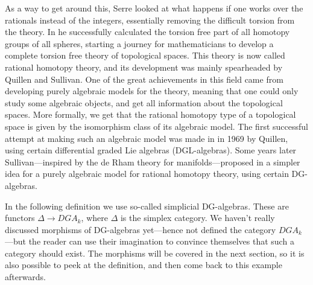 As a way to get around this, Serre looked at what happens if one works over the rationals instead of the integers, essentially removing the difficult torsion from the theory. In \cite{Serre} he successfully calculated the torsion free part of all homotopy groups of all spheres, starting a journey for mathematicians to develop a complete torsion free theory of topological spaces. This theory is now called rational homotopy theory, and its development was mainly spearheaded by Quillen and Sullivan. One of the great achievements in this field came from developing purely algebraic models for the theory, meaning that one could only study some algebraic objects, and get all information about the topological spaces. More formally, we get that the rational homotopy type of a topological space is given by the isomorphism class of its algebraic model. The first successful attempt at making such an algebraic model was made in \cite{Quillen} in 1969 by Quillen, using certain differential graded Lie algebras (DGL-algebras). Some years later Sullivan---inspired by the de Rham theory for manifolds---proposed in \cite{Sullivan} a simpler idea for a purely algebraic model for rational homotopy theory, using certain DG-algebras. 

In the following definition we use so-called simplicial DG-algebras. These are functors $\Delta \longrightarrow DGA_k$, where $\Delta$ is the simplex category. We haven't really discussed morphisms of DG-algebras yet---hence not defined the category $DGA_k$---but the reader can use their imagination to convince themselves that such a category should exist. The morphisms will be covered in the next section, so it is also possible to peek at the definition, and then come back to this example afterwards. 

